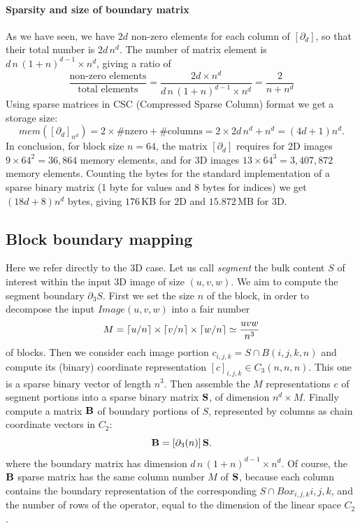 \paragraph{Sparsity and size of boundary matrix }\label{sec:bbbb} 

As we have seen, we have $2d$ non-zero elements for each column of $[\partial_d]$, so that their total number is $2d\,n^d$. The number of matrix element is $d\,n\,(1+n)^{d-1} \times n^d$, giving a ratio of 
\[
\frac{\mbox{non-zero\ elements}}{\mbox{total\ elements}} = 
\frac{2d\times n^d}{d\,n\,(1+n)^{d-1} \times n^d} =
\frac{2}{n+n^d}
\]
Using sparse matrices in CSC (Compressed Sparse Column) format we get a storage size:
\[
mem([\partial_d]_{n^d}) = 2\times \#\mbox{nzero} + \#\mbox{columns} = 2\times 2d\,n^d + n^d = (4d+1)n^d.
\]
In conclusion, for block size $n=64$, the matrix $[\partial_d]$ requires for 2D images $9\times 64^2=36,864$ memory elements, and for 3D images $13\times 64^3=3,407,872$ memory elements. Counting the bytes for the standard implementation of a sparse binary matrix (1 byte for values and 8 bytes for indices) we get $(18d+8)n^d$ bytes, giving $176$\,KB for 2D and $15.872$\,MB for 3D.

\subsection{Block boundary mapping}\label{sec:bbbb}

Here we refer directly to the 3D case.
Let us call \emph{segment} the bulk content $S$ of interest within the input 3D image of size $(u,v,w)$. We aim to compute the segment boundary $\partial_3 S$. 
First we set the size $n$ of the block, in order to decompose the input $Image(u,v,w)$ into a fair number 
\[
M = \left\lceil u/n \right\rceil \times \left\lceil v/n \right\rceil \times \left\lceil w/n \right\rceil \simeq \frac{uvw}{n^3}
\] of blocks. 
Then we consider each image portion $c_{i,j,k} = S\cap B(i,j,k,n)$ and compute its (binary) coordinate representation  $[c]_{i,j,k}\in C_3(n,n,n)$. This one is a sparse binary vector of length $n^3$. Then assemble the $M$ representations $c$ of segment portions into a sparse binary matrix ${\bf S}$, of dimension $n^d \times M$. Finally compute a matrix ${\bf B}$ of boundary portions of $S$, represented by columns as chain coordinate vectors in $C_2$:
\[
{\bf B} = [\partial_3(n)]\, {\bf S}.
\]
where the boundary matrix has dimension $d\,n\,(1+n)^{d-1} \times n^d$.
Of course, the ${\bf B}$ sparse matrix has the same column number $M$ of ${\bf S}$, because each column contains the boundary representation of the corresponding $S\cap Box_{i,j,k}{i,j,k}$, and the number of rows of the operator, equal to the dimension of the linear space $C_2$.

